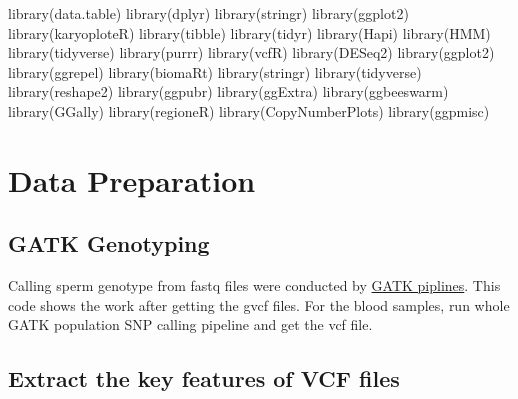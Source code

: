 \documentclass[
  letterpaper,
  DIV=11,
  numbers=noendperiod]{scrreprt}
\newenvironment{Shaded}{\begin{snugshade}}{\end{snugshade}}
\newcommand{\FunctionTok}[1]{\textcolor[rgb]{0.28,0.35,0.67}{#1}}
\newcommand{\NormalTok}[1]{\textcolor[rgb]{0.00,0.23,0.31}{#1}}
\begin{document}
\begin{Shaded}
\begin{Highlighting}[]
\FunctionTok{library}\NormalTok{(data.table)}
\FunctionTok{library}\NormalTok{(dplyr)}
\FunctionTok{library}\NormalTok{(stringr)}
\FunctionTok{library}\NormalTok{(ggplot2)}
\FunctionTok{library}\NormalTok{(karyoploteR)}
\FunctionTok{library}\NormalTok{(tibble)}
\FunctionTok{library}\NormalTok{(tidyr)}
\FunctionTok{library}\NormalTok{(Hapi)}
\FunctionTok{library}\NormalTok{(HMM)}
\FunctionTok{library}\NormalTok{(tidyverse)}
\FunctionTok{library}\NormalTok{(purrr)}
\FunctionTok{library}\NormalTok{(vcfR)}
\FunctionTok{library}\NormalTok{(DESeq2)}
\FunctionTok{library}\NormalTok{(ggplot2)}
\FunctionTok{library}\NormalTok{(ggrepel)}
\FunctionTok{library}\NormalTok{(biomaRt)}
\FunctionTok{library}\NormalTok{(stringr)}
\FunctionTok{library}\NormalTok{(tidyverse)}
\FunctionTok{library}\NormalTok{(reshape2)}
\FunctionTok{library}\NormalTok{(ggpubr)}
\FunctionTok{library}\NormalTok{(ggExtra)}
\FunctionTok{library}\NormalTok{(ggbeeswarm)}
\FunctionTok{library}\NormalTok{(GGally)}
\FunctionTok{library}\NormalTok{(regioneR)}
\FunctionTok{library}\NormalTok{(CopyNumberPlots)}
\FunctionTok{library}\NormalTok{(ggpmisc)}
\end{Highlighting}
\end{Shaded}


\hypertarget{data-preparation}{%
\chapter{Data Preparation}\label{data-preparation}}

\hypertarget{gatk-genotyping}{%
\section{GATK Genotyping}\label{gatk-genotyping}}

Calling sperm genotype from fastq files were conducted by
\href{https://gatk.broadinstitute.org/hc/en-us}{GATK piplines}. This
code shows the work after getting the gvcf files. For the blood samples,
run whole GATK population SNP calling pipeline and get the vcf file.

\hypertarget{extract-the-key-features-of-vcf-files}{%
\section{Extract the key features of VCF
files}\label{extract-the-key-features-of-vcf-files}}
\end{document}
